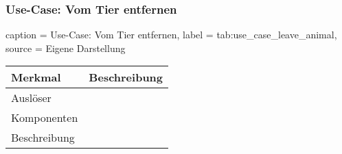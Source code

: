 \subsubsection{Use-Case: Vom Tier entfernen}

\begin{dhbwtable}{%
    caption	= Use-Case: Vom Tier entfernen,
    label	= tab:use_case_leave_animal,
    source	= Eigene Darstellung
}
    \begin{tabular}{ll}
        \toprule
        \textbf{Merkmal}     & \textbf{Beschreibung}  \\\midrule
        Auslöser     &\\
        Komponenten  & \\
        Beschreibung & \\\bottomrule
    \end{tabular}    
\end{dhbwtable}